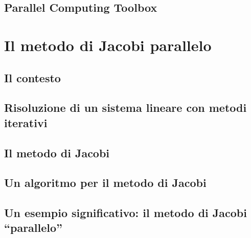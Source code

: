 \documentclass[
	a4paper,
	twoside,
	12pt
]{book}
\begin{document}
\section{Parallel Computing Toolbox}
\label{par2.2}

\nocite{TheMathworksIncGetStartedParallel}
\nocite{TheMathworksIncQuickStartParallel}
\chapter{Il metodo di Jacobi parallelo}
\label{cap:metodoJacobiParallelo}

\section{Il contesto}
\label{par:contestoMetodoJacobi}

\nocite{Quarteroni2002}
\nocite{Quarteroni1997}
\section{Risoluzione di un sistema lineare con metodi iterativi}

\section{Il metodo di Jacobi}
\label{par:metodoJacobi}

\nocite{Bini2013}
\section{Un algoritmo per il metodo di Jacobi}
\label{par:algoritmoJacobi}

\section{Un esempio significativo: il metodo di Jacobi \enquote{parallelo}}
\label{par:applicazioneMetodoJacobi}

\nocite{TheMathworksIncUseDistributedArrays}
\end{document}
